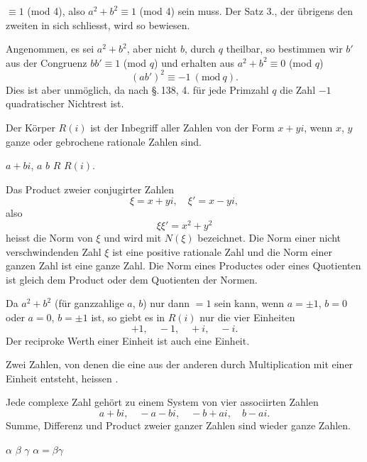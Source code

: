 
$\equiv 1$ (mod 4), also $a^2+b^2\equiv 1$ (mod 4) sein muss. Der Satz 3.,
der übrigens den zweiten in sich schliesst, wird so bewiesen.

Angenommen, es sei $a^2+b^2$, aber nicht $b$, durch $q$ theilbar,
so bestimmen wir $b'$ aus der Congruenz $bb'\equiv 1$ (mod $q$) und
erhalten aus $a^2+b^2\equiv 0$ (mod $q$)
\[
(ab')^2\equiv -1\ (\mathrm{mod}\ q).
\]
Dies ist aber unmöglich, da nach \S.\,138, 4. für jede Primzahl $q$
die Zahl $-1$ quadratischer Nichtrest ist.

Der Körper $R(i)$ ist der Inbegriff aller Zahlen von der
Form $x+yi$, wenn $x$, $y$ ganze oder gebrochene rationale Zahlen
sind.

 $a+bi$,  $a$  $b$  $R$  $R(i)$.

Das Product zweier conjugirter Zahlen
\[
\xi=x+yi,\quad \xi'=x-yi,
\]
also
\[
\xi\xi'=x^2+y^2
\]
heisst die Norm von $\xi$ und wird mit $N(\xi)$ bezeichnet. Die Norm
einer nicht verschwindenden Zahl $\xi$ ist eine positive rationale
Zahl und die Norm einer ganzen Zahl ist eine ganze Zahl. Die
Norm eines Productes oder eines Quotienten ist gleich dem Product
 oder dem Quotienten der Normen.


Da $a^2+b^2$ (für ganzzahlige $a$, $b$) nur dann $=1$ sein kann,
wenn $a=\pm 1$, $b=0$ oder $a=0$, $b=\pm 1$ ist, so giebt es in
$R(i)$ nur die vier Einheiten
\[
+1,\quad -1,\quad +i,\quad -i.
\]
Der reciproke Werth einer Einheit ist auch eine Einheit.

Zwei Zahlen, von denen die eine aus der anderen durch
Multiplication mit einer Einheit entsteht, heissen .

Jede complexe Zahl gehört zu einem System von vier associirten
 Zahlen
\[
a+bi,\quad -a-bi,\quad -b+ai,\quad b-ai.
\]
Summe, Differenz und Product zweier ganzer Zahlen sind
wieder ganze Zahlen.

 $\alpha$  $\beta$
 $\gamma$  $\alpha=\beta\gamma$ 
